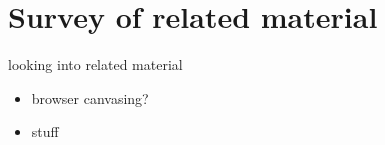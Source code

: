 \section{Survey of related material}
\label{sec:related}
looking into related material
\begin{itemize}
\item browser canvasing?
\item stuff
\end{itemize}